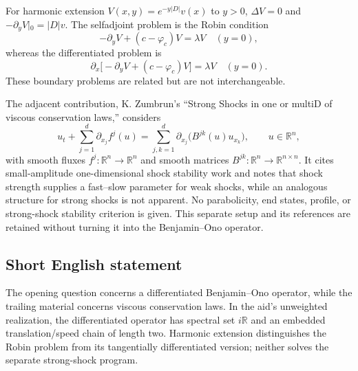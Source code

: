 \documentclass[11pt]{article}
\newcommand{\R}{\mathbb{R}}
\begin{document}
For harmonic extension $V(x,y)=e^{-y|D|}v(x)$ to $y>0$, $\Delta V=0$ and $-\partial_yV|_0=|D|v$. The selfadjoint problem is the Robin condition
\[
-\partial_yV+(c-\varphi_c)V=\lambda V\quad(y=0),
\]
whereas the differentiated problem is
\[
\partial_x\bigl[-\partial_yV+(c-\varphi_c)V\bigr]=\lambda V\quad(y=0).
\]
These boundary problems are related but are not interchangeable.

The adjacent contribution, K. Zumbrun's ``Strong Shocks in one or multiD of viscous conservation laws,'' considers
\[
u_t+\sum_{j=1}^d\partial_{x_j}f^j(u)
=\sum_{j,k=1}^d\partial_{x_j}\bigl(B^{jk}(u)u_{x_k}\bigr),\qquad u\in\R^n,
\]
with smooth fluxes $f^j:\R^n\to\R^n$ and smooth matrices $B^{jk}:\R^n\to\R^{n\times n}$. It cites small-amplitude one-dimensional shock stability work and notes that shock strength supplies a fast--slow parameter for weak shocks, while an analogous structure for strong shocks is not apparent. No parabolicity, end states, profile, or strong-shock stability criterion is given. This separate setup and its references are retained without turning it into the Benjamin--Ono operator.
\subsection{Short English statement}
The opening question concerns a differentiated Benjamin--Ono operator, while the trailing material concerns viscous conservation laws. In the aid's unweighted realization, the differentiated operator has spectral set $i\R$ and an embedded translation/speed chain of length two. Harmonic extension distinguishes the Robin problem from its tangentially differentiated version; neither solves the separate strong-shock program.
\end{document}
